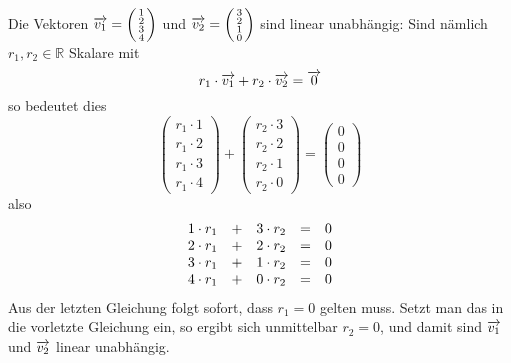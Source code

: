 \begin{beispiel} Die Vektoren $\overrightarrow{v_1} = \left( \begin{smallmatrix} 1 \\ 2 \\ 3 \\ 4
\end{smallmatrix} \right)$ und $\overrightarrow{v_2} = \left( \begin{smallmatrix} 3 \\ 2 \\ 1 \\ 0 
\end{smallmatrix} \right)$ sind linear unabhängig: Sind nämlich $r_1, r_2 \in \mathbb R$ Skalare mit 
  	$$  r_1 \cdot \overrightarrow{v_1} + r_2 \cdot  \overrightarrow{v_2} =  \overrightarrow{0} $$
so bedeutet dies 
  	$$ \left( \begin{matrix} r_1 \cdot 1 \\ r_1 \cdot 2 \\ r_1 \cdot 3 \\ r_1 \cdot 4 \end{matrix} 
    	\right) + \left( \begin{matrix} r_2 \cdot  3 \\ r_2 \cdot 2 
     	\\ r_2 \cdot 1 \\ r_2 \cdot 0 \end{matrix} \right) =
     	\left( \begin{matrix} 0 \\ 0 \\ 0 \\ 0 \end{matrix} \right) $$
also 
 	 $$ \begin{array} { l c l c l}
    	1 \cdot r_1 & + & 3 \cdot r_2 & = & 0 \\
    	2 \cdot r_1 & + & 2 \cdot r_2 & = & 0 \\
    	3 \cdot r_1 & + & 1 \cdot r_2 & = & 0 \\
    	4 \cdot r_1 & + & 0 \cdot r_2 & = & 0 \\
    	\end{array} $$
Aus der letzten Gleichung folgt sofort, dass $r_1 = 0$ gelten muss. Setzt man das in die vorletzte Gleichung ein, so 
ergibt sich unmittelbar $r_2 = 0$, und damit sind $\overrightarrow{v_1}$ und $\overrightarrow{v_2}$ linear unabhängig.
\end{beispiel}

